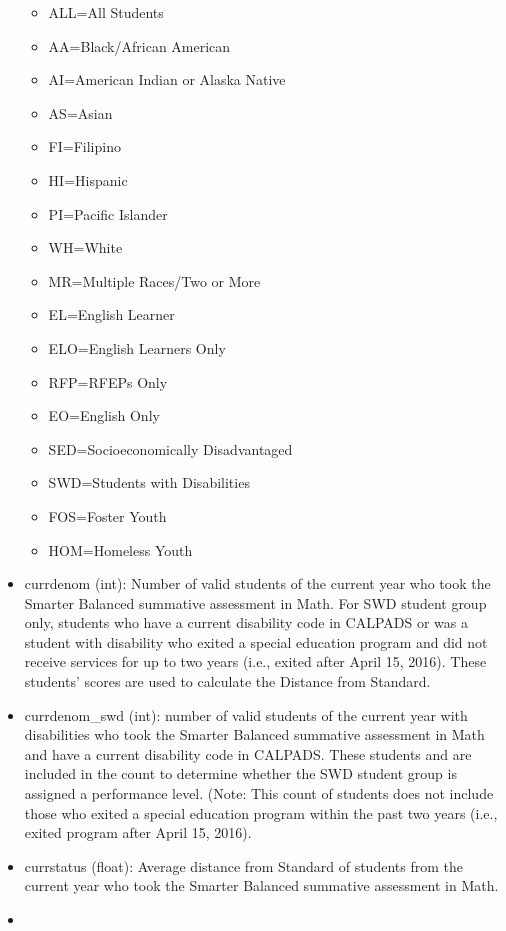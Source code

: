 \documentclass[11pt]{article}
\providecommand{\tightlist}{%
      \setlength{\itemsep}{0pt}\setlength{\parskip}{0pt}}
\begin{document}
\begin{itemize}
  \begin{itemize}
  \tightlist
  \item
    ALL=All Students
  \item
    AA=Black/African American
  \item
    AI=American Indian or Alaska Native
  \item
    AS=Asian
  \item
    FI=Filipino
  \item
    HI=Hispanic
  \item
    PI=Pacific Islander
  \item
    WH=White
  \item
    MR=Multiple Races/Two or More
  \item
    EL=English Learner
  \item
    ELO=English Learners Only
  \item
    RFP=RFEPs Only
  \item
    EO=English Only
  \item
    SED=Socioeconomically Disadvantaged
  \item
    SWD=Students with Disabilities
  \item
    FOS=Foster Youth
  \item
    HOM=Homeless Youth
  \end{itemize}
\item
  currdenom (int): Number of valid students of the current year who took
  the Smarter Balanced summative assessment in Math. For SWD student
  group only, students who have a current disability code in CALPADS or
  was a student with disability who exited a special education program
  and did not receive services for up to two years (i.e., exited after
  April 15, 2016). These students' scores are used to calculate the
  Distance from Standard.
\item
  currdenom\_swd (int): number of valid students of the current year
  with disabilities who took the Smarter Balanced summative assessment
  in Math and have a current disability code in CALPADS. These students
  and are included in the count to determine whether the SWD student
  group is assigned a performance level. (Note: This count of students
  does not include those who exited a special education program within
  the past two years (i.e., exited program after April 15, 2016).
\item
  currstatus (float): Average distance from Standard of students from
  the current year who took the Smarter Balanced summative assessment in
  Math.
\item

\end{itemize}
\end{document}
